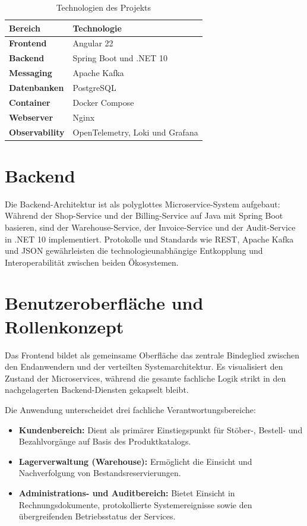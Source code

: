 \documentclass[
  11pt,
  a4paper,
  oneside,
  headings=normal,
  parskip=half,
  DIV=12
]{scrreprt}
\begin{document}
\begin{table}[H]
  \centering
  \caption{Technologien des Projekts
  \label{tab:technologien}}
  \begin{tabularx}{0.88\textwidth}{>{\bfseries}p{3.2cm}X}
    \toprule
    Bereich & Technologie \\
    \midrule
    Frontend & Angular 22 \\
    Backend & Spring Boot und .NET 10 \\
    Messaging & Apache Kafka \\
    Datenbanken & PostgreSQL \\
    Container & Docker Compose \\
    Webserver & Nginx \\
    Observability & OpenTelemetry, Loki und Grafana \\
    \bottomrule
  \end{tabularx}
\end{table}

\section{Backend}

Die Backend-Architektur ist als polyglottes Microservice-System aufgebaut: Während der Shop-Service und der Billing-Service auf Java mit Spring Boot basieren, sind der Warehouse-Service, der Invoice-Service und der Audit-Service in .NET 10 implementiert. Protokolle und Standards wie REST, Apache Kafka und JSON gewährleisten die technologieunabhängige Entkopplung und Interoperabilität zwischen beiden Ökosystemen.

\section{Benutzeroberfläche und Rollenkonzept}

Das Frontend bildet als gemeinsame Oberfläche das zentrale Bindeglied zwischen den Endanwendern und der verteilten Systemarchitektur. Es visualisiert den Zustand der Microservices, während die gesamte fachliche Logik strikt in den nachgelagerten Backend-Diensten gekapselt bleibt.

Die Anwendung unterscheidet drei fachliche Verantwortungsbereiche:
\begin{itemize}
    \item \textbf{Kundenbereich:} Dient als primärer Einstiegspunkt für Stöber-, Bestell- und Bezahlvorgänge auf Basis des Produktkatalogs.
    \item \textbf{Lagerverwaltung (Warehouse):} Ermöglicht die Einsicht und Nachverfolgung von Bestandsreservierungen.
    \item \textbf{Administrations- und Auditbereich:} Bietet Einsicht in Rechnungsdokumente, protokollierte Systemereignisse sowie den übergreifenden Betriebsstatus der Services.
\end{itemize}
\end{document}
